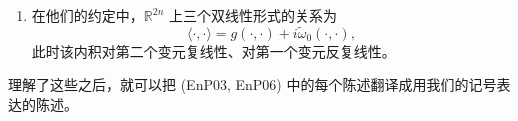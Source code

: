 \begin{enumerate}[label=(\arabic*)]
  \item 在他们的约定中，$\mathbb R^{2n}$ 上三个双线性形式的关系为
  \[
    \langle\cdot,\cdot\rangle=g(\cdot,\cdot)+i\widetilde\omega_0(\cdot,\cdot),
  \]
  此时该内积对第二个变元复线性、对第一个变元反复线性。
\end{enumerate}

理解了这些之后，就可以把 (EnP03, EnP06) 中的每个陈述翻译成用我们的记号表达的陈述。
